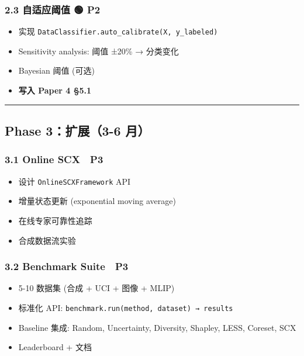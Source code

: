 \documentclass[
  12pt,
]{ctexart}
\providecommand{\tightlist}{%
  \setlength{\itemsep}{0pt}\setlength{\parskip}{0pt}}
\begin{document}
\subsubsection{2.3 自适应阈值 🟢
P2}\label{ux81eaux9002ux5e94ux9608ux503c-p2-1}

\begin{itemize}
\tightlist
\item[$\square$]
  实现 \texttt{DataClassifier.auto\_calibrate(X,\ y\_labeled)}
\item[$\square$]
  Sensitivity analysis: 阈值 ±20\% → 分类变化
\item[$\square$]
  Bayesian 阈值 (可选)
\item[$\square$]
  \textbf{写入 Paper 4 §5.1}
\end{itemize}

\begin{center}\rule{0.5\linewidth}{0.5pt}\end{center}

\subsection{Phase 3：扩展（3-6
月）}\label{phase-3ux6269ux5c553-6-ux6708}

\subsubsection{3.1 Online SCX 🔵 P3}\label{online-scx-p3}

\begin{itemize}
\tightlist
\item[$\square$]
  设计 \texttt{OnlineSCXFramework} API
\item[$\square$]
  增量状态更新 (exponential moving average)
\item[$\square$]
  在线专家可靠性追踪
\item[$\square$]
  合成数据流实验
\end{itemize}

\subsubsection{3.2 Benchmark Suite 🔵 P3}\label{benchmark-suite-p3}

\begin{itemize}
\tightlist
\item[$\square$]
  5-10 数据集 (合成 + UCI + 图像 + MLIP)
\item[$\square$]
  标准化 API: \texttt{benchmark.run(method,\ dataset)\ →\ results}
\item[$\square$]
  Baseline 集成: Random, Uncertainty, Diversity, Shapley, LESS, Coreset,
  SCX
\item[$\square$]
  Leaderboard + 文档
\end{itemize}
\end{document}
